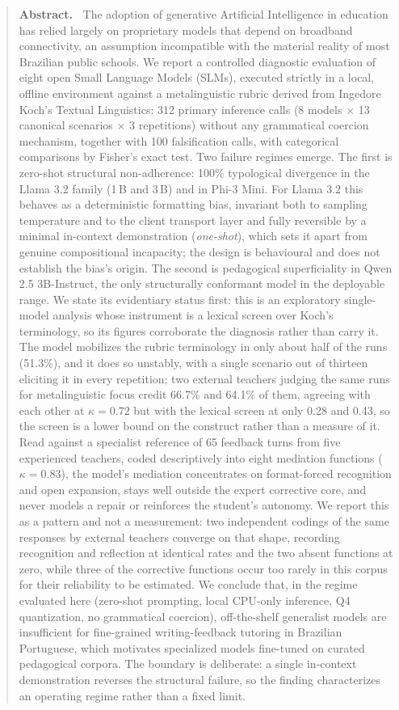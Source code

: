\documentclass{sbc2023}%
\begin{document}
\begin{frontmatter}
\begin{abstract}
\textbf{Abstract.~}
\noindent The adoption of generative Artificial Intelligence in education has relied largely on proprietary models that depend on broadband connectivity, an assumption incompatible with the material reality of most Brazilian public schools. We report a controlled diagnostic evaluation of eight open Small Language Models (SLMs), executed strictly in a local, offline environment against a metalinguistic rubric derived from Ingedore Koch's Textual Linguistics: 312 primary inference calls (8 models $\times$ 13 canonical scenarios $\times$ 3 repetitions) without any grammatical coercion mechanism, together with 100 falsification calls, with categorical comparisons by Fisher's exact test. Two failure regimes emerge. The first is zero-shot structural non-adherence: 100\% typological divergence in the Llama 3.2 family (1\,B and 3\,B) and in Phi-3 Mini. For Llama 3.2 this behaves as a deterministic formatting bias, invariant both to sampling temperature and to the client transport layer and fully reversible by a minimal in-context demonstration (\textit{one-shot}), which sets it apart from genuine compositional incapacity; the design is behavioural and does not establish the bias's origin. The second is pedagogical superficiality in Qwen 2.5 3B-Instruct, the only structurally conformant model in the deployable range. We state its evidentiary status first: this is an exploratory single-model analysis whose instrument is a lexical screen over Koch's terminology, so its figures corroborate the diagnosis rather than carry it. The model mobilizes the rubric terminology in only about half of the runs (51.3\%), and it does so unstably, with a single scenario out of thirteen eliciting it in every repetition; two external teachers judging the same runs for metalinguistic focus credit 66.7\% and 64.1\% of them, agreeing with each other at $\kappa = 0.72$ but with the lexical screen at only 0.28 and 0.43, so the screen is a lower bound on the construct rather than a measure of it. Read against a specialist reference of 65 feedback turns from five experienced teachers, coded descriptively into eight mediation functions ($\kappa = 0.83$), the model's mediation concentrates on format-forced recognition and open expansion, stays well outside the expert corrective core, and never models a repair or reinforces the student's autonomy. We report this as a pattern and not a measurement: two independent codings of the same responses by external teachers converge on that shape, recording recognition and reflection at identical rates and the two absent functions at zero, while three of the corrective functions occur too rarely in this corpus for their reliability to be estimated. We conclude that, in the regime evaluated here (zero-shot prompting, local CPU-only inference, Q4 quantization, no grammatical coercion), off-the-shelf generalist models are insufficient for fine-grained writing-feedback tutoring in Brazilian Portuguese, which motivates specialized models fine-tuned on curated pedagogical corpora. The boundary is deliberate: a single in-context demonstration reverses the structural failure, so the finding characterizes an operating regime rather than a fixed limit.

\end{abstract}
\end{frontmatter}
\end{document}
